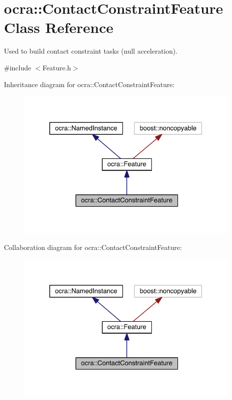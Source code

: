 \hypertarget{classocra_1_1ContactConstraintFeature}{}\section{ocra\+:\+:Contact\+Constraint\+Feature Class Reference}
\label{classocra_1_1ContactConstraintFeature}


Used to build contact constraint tasks (null acceleration).  




{\ttfamily \#include $<$Feature.\+h$>$}



Inheritance diagram for ocra\+:\+:Contact\+Constraint\+Feature\+:\nopagebreak
\begin{figure}[H]
\begin{center}
\leavevmode
\includegraphics[width=312pt]{d5/d61/classocra_1_1ContactConstraintFeature__inherit__graph}
\end{center}
\end{figure}


Collaboration diagram for ocra\+:\+:Contact\+Constraint\+Feature\+:\nopagebreak
\begin{figure}[H]
\begin{center}
\leavevmode
\includegraphics[width=312pt]{df/d49/classocra_1_1ContactConstraintFeature__coll__graph}
\end{center}
\end{figure}
